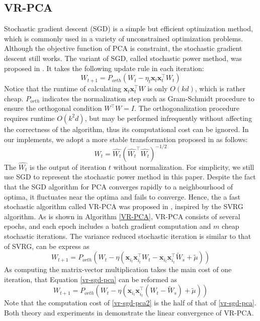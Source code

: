 \documentclass[conference]{IEEEtran}
\begin{document}
 \subsection{VR-PCA}
 Stochastic gradient descent (SGD) is a simple but efficient optimization method, which is commonly used in a variety of unconstrained optimization problems. Although the objective function of PCA is constraint, the stochastic gradient descent still works. The variant of SGD, called stochastic power method, was proposed in \citep{Arora2014Stochastic}. It takes the following update rule in each iteration:
 \begin{equation}
 \label{sgd-pca}
 W_{t+1} = P_{orth}(W_{t} - \eta_t \mathbf{x}_{t}\mathbf{x}_{t}^{\top}W_{t})
 \end{equation}
 Notice that the runtime of calculating $\mathbf{x}_{t}\mathbf{x}_{t}^{\top}W$ is only $O(kd)$, which is rather cheap. $P_{orth}$ indicates the normalization step such as  Gram-Schmidt procedure to ensure the orthogonal condition $W^{\top}W=I$. The orthogonalization procedure requires runtime $O(k^2d)$, but may be performed infrequently without affecting the correctness of the algorithm, thus its computational cost can be ignored.
 In our implements, we adopt a more stable transformation proposed in \citep{Shamir2015Fast} as follows:
 \begin{equation}
 \label{orthogonalization}
 W_t = \hat{W_t}(\hat{W_t}^{\top}\hat{W_t})^{-1/2}
 \end{equation}
 The $\hat{W_t}$ is the output of iteration $t$ without normalization.
 For simplicity, we still use SGD to represent the stochastic power method in this paper.
 Despite the fact that the SGD algorithm for PCA converges rapidly to a neighbourhood of optima, it fluctuates near the optima and fails to converge. Hence, the a fast stochastic algorithm called VR-PCA was proposed in \citep{Shamir2015A}, inspired by the SVRG algorithm. As is shown in Algorithm \ref{VR-PCA}, VR-PCA consists of several epochs, and each epoch includes a batch gradient computation and $m$ cheap stochastic iterations. The variance reduced stochastic iteration is similar to that of SVRG, can be express as
 \begin{equation}
 \label{vr-sgd-pca}
 W_{t+1} = P_{orth}(W_{t} - \eta(\mathbf{x}_{i_t}\mathbf{x}_{i_t}^{\top}W_{t}- \mathbf{x}_{i_t}\mathbf{x}_{i_t}^{\top}\tilde{W}_{s}+\tilde{\mu}))
 \end{equation}
  As computing the matrix-vector multiplication takes the main cost of one iteration, that Equation \ref{vr-sgd-pca} can be reformed as 
 \begin{equation}
 \label{vr-sgd-pca2}
 W_{t+1} = P_{orth}(W_{t} - \eta(\mathbf{x}_{i_t}\mathbf{x}_{i_t}^{\top}(W_{t}-\tilde{W}_{s})+\tilde{\mu}))
 \end{equation}
 Note that the computation cost of \ref{vr-sgd-pca2} is the half of that of \ref{vr-sgd-pca}.
 Both theory and experiments in \citep{Shamir2015A} demonstrate the linear convergence of VR-PCA.
 
\end{document}
